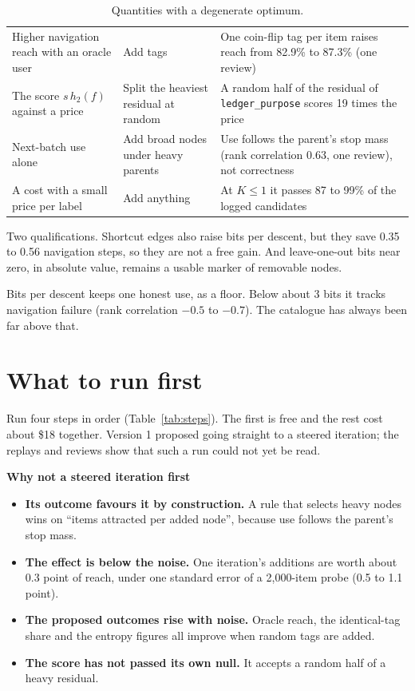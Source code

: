 \documentclass[10pt,a4paper]{article}
\newcommand{\code}[1]{\texttt{#1}}
\newcommand{\lab}[1]{\par\vspace{0.35em}\textbf{#1}\par\nobreak}
\newenvironment{rtable}[1]{\begin{table}[!htb]\caption{#1}\small}{\end{table}}
\begin{document}
\begin{rtable}{Quantities with a degenerate optimum.\label{tab:avoid}}
\begin{tabularx}{\linewidth}{@{}P{4.3cm} P{4.6cm} L@{}}
Higher navigation reach with an oracle user & Add tags & One coin-flip tag per item raises reach from 82.9\% to 87.3\% (one review) \\
The score $s\,h_2(f)$ against a price & Split the heaviest residual at random & A random half of the residual of \code{ledger\_purpose} scores 19 times the price \\
Next-batch use alone & Add broad nodes under heavy parents & Use follows the parent's stop mass (rank correlation 0.63, one review), not correctness \\
A cost with a small price per label & Add anything & At $K \le 1$ it passes 87 to 99\% of the logged candidates \\
\bottomrule
\end{tabularx}
\end{rtable}

Two qualifications. Shortcut edges also raise bits per descent, but they save 0.35 to 0.56 navigation steps, so they are not a free gain. And leave-one-out bits near zero, in absolute value, remains a usable marker of removable nodes.

Bits per descent keeps one honest use, as a floor. Below about 3 bits it tracks navigation failure (rank correlation $-0.5$ to $-0.7$). The catalogue has always been far above that.

\section{What to run first}
\label{sec:first}

Run four steps in order (Table~\ref{tab:steps}). The first is free and the rest cost about \$18 together.
Version 1 proposed going straight to a steered iteration; the replays and reviews show that such a run could
not yet be read.

\lab{Why not a steered iteration first}
\begin{itemize}
\item \textbf{Its outcome favours it by construction.} A rule that selects heavy nodes wins on ``items attracted per added node'', because use follows the parent's stop mass.
\item \textbf{The effect is below the noise.} One iteration's additions are worth about 0.3 point of reach, under one standard error of a 2,000-item probe (0.5 to 1.1 point).
\item \textbf{The proposed outcomes rise with noise.} Oracle reach, the identical-tag share and the entropy figures all improve when random tags are added.
\item \textbf{The score has not passed its own null.} It accepts a random half of a heavy residual.
\end{itemize}
\end{document}

